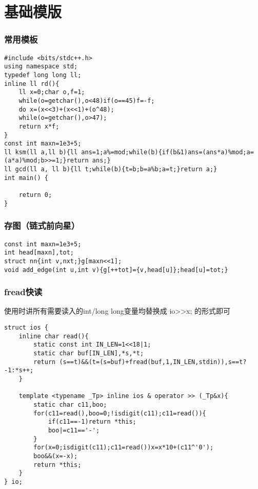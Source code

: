 \documentclass[12pt]{article}
\begin{document}
     
\tableofcontents
\newpage
\part{基础模版}

\section{常用模板}

{\setmainfont{Consolas}
\begin{lstlisting}
#include <bits/stdc++.h>
using namespace std;
typedef long long ll;
inline ll rd(){
    ll x=0;char o,f=1;
    while(o=getchar(),o<48)if(o==45)f=-f;
    do x=(x<<3)+(x<<1)+(o^48);
    while(o=getchar(),o>47);
    return x*f;
}
const int maxn=1e3+5;
ll ksm(ll a,ll b){ll ans=1;a%=mod;while(b){if(b&1)ans=(ans*a)%mod;a=(a*a)%mod;b>>=1;}return ans;}
ll gcd(ll a, ll b){ll t;while(b){t=b;b=a%b;a=t;}return a;}
int main() {
   	
    return 0;
}
\end{lstlisting}

\section{存图（链式前向星）}

{\setmainfont{Consolas}
\begin{lstlisting}
const int maxn=1e3+5;
int head[maxn],tot;
struct nn{int v,nxt;}g[maxn<<1];
void add_edge(int u,int v){g[++tot]={v,head[u]};head[u]=tot;}
\end{lstlisting}



\section{fread快读}

使用时讲所有需要读入的int/long long变量均替换成 io>>x; 的形式即可 

{\setmainfont{Consolas}
\begin{lstlisting}
struct ios {
    inline char read(){
        static const int IN_LEN=1<<18|1;
        static char buf[IN_LEN],*s,*t;
        return (s==t)&&(t=(s=buf)+fread(buf,1,IN_LEN,stdin)),s==t?-1:*s++;
    }

    template <typename _Tp> inline ios & operator >> (_Tp&x){
        static char c11,boo;
        for(c11=read(),boo=0;!isdigit(c11);c11=read()){
            if(c11==-1)return *this;
            boo|=c11=='-';
        }
        for(x=0;isdigit(c11);c11=read())x=x*10+(c11^'0');
        boo&&(x=-x);
        return *this;
    }
} io;
\end{lstlisting}

}}}
\end{document}
